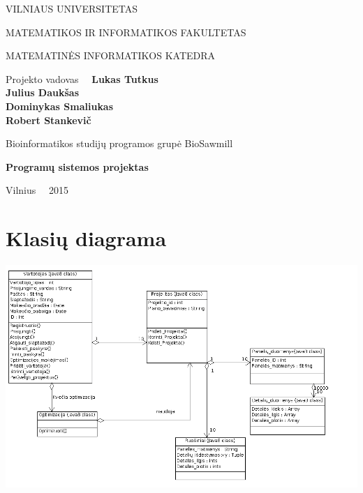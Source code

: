 \documentclass[a4paper,12pt]{article}
\begin{document}
\graphicspath{ {/} }

\renewcommand{\cftdot}{.}	
\renewcommand{\cftsecleader}{\cftdotfill{\cftdotsep}}

\thispagestyle{empty} %


\begin{center}
 VILNIAUS UNIVERSITETAS 
 
MATEMATIKOS IR INFORMATIKOS FAKULTETAS

MATEMATINĖS INFORMATIKOS KATEDRA

\vspace{4cm}

Projekto vadovas \ \ \textbf{Lukas Tutkus} \\
\textbf{Julius Daukšas} \\
\textbf{Dominykas Smaliukas} \\
\textbf{Robert Stankevič} \\

\vspace{0.2cm}

Bioinformatikos studijų programos grupė BioSawmill



\vspace{3cm}
\textbf{\Large Programų sistemos projektas}\\


\vfill

Vilnius \ \  2015
\end{center}



\clearpage

\tableofcontents
\clearpage


\section{Klasių diagrama}
\includegraphics[scale=0.5]{ClassDiagram}
\end{document}
